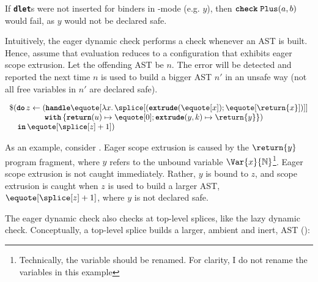 If \textbf{\texttt{dlet}}s were not inserted for binders in \quotemode{}-mode (e.g. $y$), then $\textbf{\texttt{check}}\; \texttt{Plus}(a, b)$ would fail, as $y$ would not be declared safe. 

Intuitively, the eager dynamic check performs a check whenever an AST is built. Hence, assume that evaluation reduces to a configuration that exhibits eager scope extrusion. Let the offending AST be $n$. The error will be detected and reported the next time $n$ is used to build a bigger AST $n'$ in an unsafe way (not all free variables in $n'$ are declared safe). 

\begin{code} 
 \begin{source}
  $\begin{array}{l}
      \$(\textbf{\texttt{do}} \, z \leftarrow (\textbf{\texttt{handle}} \equote[{\lambda x. \, \splice[({{\textbf{\texttt{extrude}}(\equote[x])}; \equote[\return{x}]})]}] \\
      \quad\quad\quad\quad\,\; \textbf{\texttt{with}} \, \{ \textbf{\texttt{return}}(u) \mapsto {\equote[0]}; \textbf{\texttt{extrude}}(y, k) \mapsto {\return{y}}\})\\
      \quad \textbf{\texttt{in}} \, \equote[{\splice[z] + 1}])
    \end{array}$
 \end{source}
 \label{listing:eager-scope-extrusion-check-eg}
\end{code}

As an example, consider . Eager scope extrusion is caused by the $\return{y}$ program fragment, where $y$ refers to the unbound variable $\Var{x}{\mathbb{N}}$\footnote{Technically, the variable should be renamed. For clarity, I do not rename the variables in this example}. Eager scope extrusion is not caught immediately. Rather, $y$ is bound to $z$, and scope extrusion is caught when $z$ is used to build a larger AST, $\equote[{\splice[z]+1}]$, where $y$ is not declared safe. 

The eager dynamic check also checks at top-level splices, like the lazy dynamic check. Conceptually, a top-level splice builds a larger, ambient and inert, AST ():

